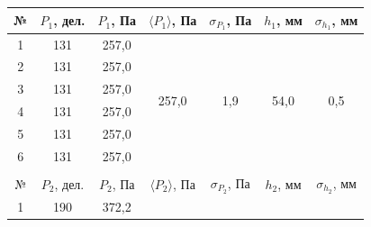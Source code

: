 \documentclass[a4paper,12pt]{article} %
\begin{document}
\begin{table}[H]
	\centering
	\begin{tabular}{ccccccc}
		\hline
		\multicolumn{1}{|c|}{№} &
		\multicolumn{1}{c|}{$ P_1 $, дел.} &
		\multicolumn{1}{c|}{$ P_1 $, Па} &
		\multicolumn{1}{c|}{$ \langle P_1 \rangle $, Па} &
		\multicolumn{1}{c|}{$ \sigma_{P_1} $, Па} &
		\multicolumn{1}{c|}{$ h_1 $, мм} &
		\multicolumn{1}{c|}{$ \sigma_{h_1} $, мм} \\ \hline
		\multicolumn{1}{|c|}{1} &
		\multicolumn{1}{c|}{131} &
		\multicolumn{1}{c|}{257,0} &
		\multicolumn{1}{c|}{\multirow{6}{*}{257,0}} &
		\multicolumn{1}{c|}{\multirow{6}{*}{1,9}} &
		\multicolumn{1}{c|}{\multirow{6}{*}{54,0}} &
		\multicolumn{1}{c|}{\multirow{6}{*}{0,5}} \\ \cline{1-3}
		\multicolumn{1}{|c|}{2} &
		\multicolumn{1}{c|}{131} &
		\multicolumn{1}{c|}{257,0} &
		\multicolumn{1}{c|}{} &
		\multicolumn{1}{c|}{} &
		\multicolumn{1}{c|}{} &
		\multicolumn{1}{c|}{} \\ \cline{1-3}
		\multicolumn{1}{|c|}{3} &
		\multicolumn{1}{c|}{131} &
		\multicolumn{1}{c|}{257,0} &
		\multicolumn{1}{c|}{} &
		\multicolumn{1}{c|}{} &
		\multicolumn{1}{c|}{} &
		\multicolumn{1}{c|}{} \\ \cline{1-3}
		\multicolumn{1}{|c|}{4} &
		\multicolumn{1}{c|}{131} &
		\multicolumn{1}{c|}{257,0} &
		\multicolumn{1}{c|}{} &
		\multicolumn{1}{c|}{} &
		\multicolumn{1}{c|}{} &
		\multicolumn{1}{c|}{} \\ \cline{1-3}
		\multicolumn{1}{|c|}{5} &
		\multicolumn{1}{c|}{131} &
		\multicolumn{1}{c|}{257,0} &
		\multicolumn{1}{c|}{} &
		\multicolumn{1}{c|}{} &
		\multicolumn{1}{c|}{} &
		\multicolumn{1}{c|}{} \\ \cline{1-3}
		\multicolumn{1}{|c|}{6} &
		\multicolumn{1}{c|}{131} &
		\multicolumn{1}{c|}{257,0} &
		\multicolumn{1}{c|}{} &
		\multicolumn{1}{c|}{} &
		\multicolumn{1}{c|}{} &
		\multicolumn{1}{c|}{} \\ \hline
		&
		&
		&
		&
		&
		&
		\\ \hline
		\multicolumn{1}{|c|}{№} &
		\multicolumn{1}{c|}{$ P_2 $, дел.} &
		\multicolumn{1}{c|}{$ P_2 $, Па} &
		\multicolumn{1}{c|}{$ \langle P_2 \rangle $, Па} &
		\multicolumn{1}{c|}{$ \sigma_{P_2} $, Па} &
		\multicolumn{1}{c|}{$ h_2 $, мм} &
		\multicolumn{1}{c|}{$ \sigma_{h_2} $, мм} \\ \hline
		\multicolumn{1}{|c|}{1} &
		\multicolumn{1}{c|}{190} &
		\multicolumn{1}{c|}{372,2} &

\end{tabular}
\end{table}
\end{document}
